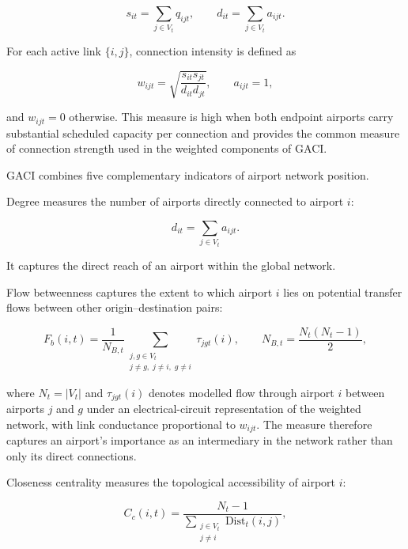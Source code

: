 \documentclass[12pt]{extarticle}
\begin{document}
\begin{equation}
s_{it}
=
\sum_{j\in V_t} q_{ijt},
\qquad
d_{it}
=
\sum_{j\in V_t} a_{ijt}.
\label{eq:nature_9}
\end{equation}

For each active link $\{i,j\}$, connection intensity is defined as

\begin{equation}
w_{ijt}
=
\sqrt{
\frac{s_{it}s_{jt}}
{d_{it}d_{jt}}
},
\qquad
a_{ijt}=1,
\label{eq:nature_10}
\end{equation}

and $w_{ijt}=0$ otherwise. This measure is high when both endpoint airports carry substantial scheduled capacity per connection and provides the common measure of connection strength used in the weighted components of GACI.

GACI combines five complementary indicators of airport network position.

Degree measures the number of airports directly connected to airport $i$:

\begin{equation}
d_{it}
=
\sum_{j\in V_t} a_{ijt}.
\label{eq:nature_11}
\end{equation}

It captures the direct reach of an airport within the global network.

Flow betweenness captures the extent to which airport $i$ lies on potential transfer flows between other origin--destination pairs:

\begin{equation}
F_b(i,t)
=
\frac{1}{N_{B,t}}
\sum_{\substack{j,g\in V_t\\
j\neq g,\; j\neq i,\; g\neq i}}
\tau_{jgt}(i),
\qquad
N_{B,t}
=
\frac{N_t(N_t-1)}{2},
\label{eq:nature_12}
\end{equation}

where $N_t=|V_t|$ and $\tau_{jgt}(i)$ denotes modelled flow through airport $i$ between airports $j$ and $g$ under an electrical-circuit representation of the weighted network, with link conductance proportional to $w_{ijt}$. The measure therefore captures an airport's importance as an intermediary in the network rather than only its direct connections.

Closeness centrality measures the topological accessibility of airport $i$:

\begin{equation}
C_c(i,t)
=
\frac{N_t-1}
{\displaystyle
\sum_{\substack{j\in V_t\\j\neq i}}
\mathrm{Dist}_t(i,j)
},
\label{eq:nature_13}
\end{equation}
\end{document}
